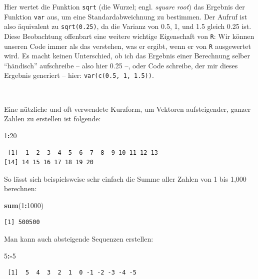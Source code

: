 \documentclass[12pt,]{tufte-book}
\newenvironment{Shaded}{\begin{snugshade}}{\end{snugshade}}
\newcommand{\KeywordTok}[1]{\textcolor[rgb]{0.13,0.29,0.53}{\textbf{#1}}}
\newcommand{\DecValTok}[1]{\textcolor[rgb]{0.00,0.00,0.81}{#1}}
\newcommand{\OperatorTok}[1]{\textcolor[rgb]{0.81,0.36,0.00}{\textbf{#1}}}
\newcommand{\NormalTok}[1]{#1}
\theoremstyle{definition}
\theoremstyle{definition}
\theoremstyle{definition}
\theoremstyle{remark}
\begin{document}
Hier wertet die Funktion \texttt{sqrt} (die Wurzel; engl. \emph{square
root}) das Ergebnis der Funktion \texttt{var} aus, um eine
Standardabweichnung zu bestimmen. Der Aufruf ist also äquivalent zu
\texttt{sqrt(0.25)}, da die Varianz von 0.5, 1, und 1.5 gleich 0.25 ist.
Diese Beobachtung offenbart eine weitere wichtige Eigenschaft von
\texttt{R}: Wir können unseren Code immer als das verstehen, was er
ergibt, wenn er von \texttt{R} ausgewertet wird. Es macht keinen
Unterschied, ob ich das Ergebnis einer Berechnung selber ``händisch''
aufschreibe -- also hier 0.25 --, oder Code schreibe, der mir dieses
Ergebnis generiert -- hier: \texttt{var(c(0.5,\ 1,\ 1.5))}.

~

Eine nützliche und oft verwendete Kurzform, um Vektoren aufsteigender,
ganzer Zahlen zu erstellen ist folgende:

\begin{Shaded}
\begin{Highlighting}[]
\DecValTok{1}\OperatorTok{:}\DecValTok{20}
\end{Highlighting}
\end{Shaded}

\begin{verbatim}
 [1]  1  2  3  4  5  6  7  8  9 10 11 12 13
[14] 14 15 16 17 18 19 20
\end{verbatim}

So lässt sich beispielsweise sehr einfach die Summe aller Zahlen von 1
bis 1,000 berechnen:

\begin{Shaded}
\begin{Highlighting}[]
\KeywordTok{sum}\NormalTok{(}\DecValTok{1}\OperatorTok{:}\DecValTok{1000}\NormalTok{)}
\end{Highlighting}
\end{Shaded}

\begin{verbatim}
[1] 500500
\end{verbatim}

Man kann auch absteigende Sequenzen erstellen:

\begin{Shaded}
\begin{Highlighting}[]
\DecValTok{5}\OperatorTok{:-}\DecValTok{5}
\end{Highlighting}
\end{Shaded}

\begin{verbatim}
 [1]  5  4  3  2  1  0 -1 -2 -3 -4 -5
\end{verbatim}
\end{document}
